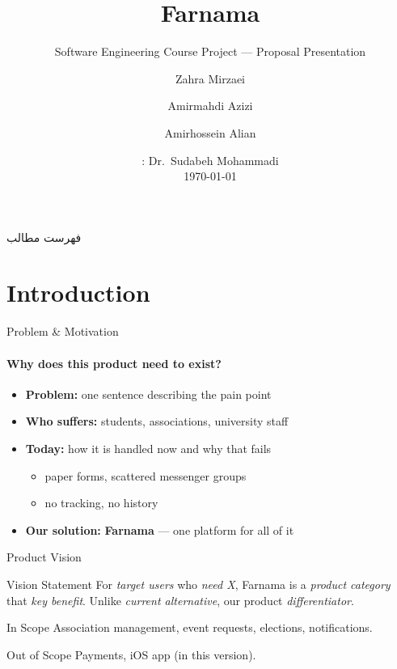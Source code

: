 \documentclass[
	11pt,              %
	aspectratio=169,   %
]{beamer}
\title[Farnama]{Farnama}
\subtitle{Software Engineering Course Project --- Proposal Presentation}
\author[Mirzaei, Azizi, Alian]{%
	Zahra Mirzaei \and Amirmahdi Azizi \and Amirhossein Alian}
\institute[KUT]{Kermanshah University of Technology}
\date[\today]{\txtInstructor: Dr.\ Sudabeh Mohammadi \\[0.2em] \today}
\newcommand{\txtOutline}{فهرست مطالب}
\newcommand{\txtOutline}{Outline}
\renewcommand{\emph}[1]{\textcolor{accent}{\textbf{#1}}}
\begin{document}
{
\begin{frame}
	\titlepage
\end{frame}
}

\begin{frame}{\txtOutline}
	\tableofcontents[hideallsubsections]
\end{frame}

\section{Introduction}

\begin{frame}{Problem \& Motivation}
	\framesubtitle{Why does this product need to exist?}

	\begin{itemize}
		\item<1-> \textbf{Problem:} one sentence describing the pain point
		\item<2-> \textbf{Who suffers:} students, associations, university staff
		\item<3-> \textbf{Today:} how it is handled now and why that fails
			\begin{itemize}
				\item paper forms, scattered messenger groups
				\item no tracking, no history
			\end{itemize}
		\item<4-> \textbf{Our solution:} \emph{Farnama} --- one platform for all of it
	\end{itemize}
\end{frame}

\begin{frame}{Product Vision}

	\begin{block}{Vision Statement}
		For \textit{target users} who \textit{need X}, Farnama is a \textit{product category}
		that \textit{key benefit}. Unlike \textit{current alternative}, our product \textit{differentiator}.
	\end{block}

	\begin{exampleblock}{In Scope}
		Association management, event requests, elections, notifications.
	\end{exampleblock}

	\begin{alertblock}{Out of Scope}
		Payments, iOS app (in this version).
	\end{alertblock}
\end{frame}
\end{document}
